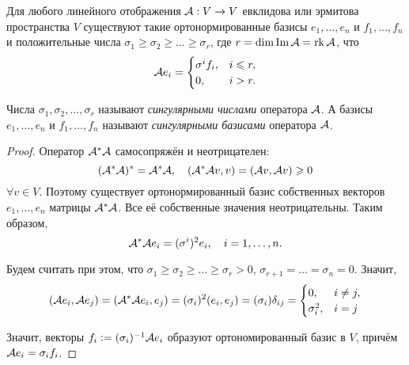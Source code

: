 \begin{theorem}
    Для любого линейного отображения $\mathcal{A}: V \to V$ евклидова или эрмитова пространства $V$ существуют такие ортонормированные базисы $e_1, \ldots, e_n$ и $f_1, \ldots, f_n$ и положительные числа $\sigma_1 \geqslant \sigma_2 \geqslant \ldots \geqslant \sigma_r$, где $r = \dim\operatorname{Im}\mathcal{A} = \operatorname{rk}\mathcal{A}$, что
    \[
        \mathcal{A} e_i =
        \begin{cases}
            \sigma^if_i,& i \leqslant r,\\
            0,& i > r.
        \end{cases}
    \]

    Числа $\sigma_1, \sigma_2, \ldots, \sigma_r$ называют \textit{сингулярными числами} оператора $\mathcal{A}$. А базисы $e_1, \ldots, e_n$ и $f_1, \ldots, f_n$ называют \textit{сингулярными базисами} оператора $\mathcal{A}$.
\end{theorem}

\begin{proof}
    Оператор $\mathcal{A}^\ast\mathcal{A}$ самосопряжён и неотрицателен:
    \[
        (\mathcal{A}^\ast\mathcal{A})^\ast = \mathcal{A}^\ast\mathcal{A},\quad(\mathcal{A}^\ast\mathcal{A} v, v) = (\mathcal{A} v, \mathcal{A} v) \geqslant 0
    \]
    $\forall v \in V$. Поэтому существует ортонормированный базис собственных векторов $e_1, \ldots, e_n$ матрицы $\mathcal{A}^\ast\mathcal{A}$. Все её собственные значения неотрицательны. Таким образом,
    \[
        \mathcal{A}^\ast\mathcal{A} e_i = (\sigma^i)^2e_i,\quad i = 1, \ldots, n.
    \]

    Будем считать при этом, что $\sigma_1 \geqslant \sigma_2 \geqslant \ldots \geqslant \sigma_r > 0$, $\sigma_{r + 1} = \ldots = \sigma_n = 0$. Значит,
    \[
        (\mathcal{A} e_i, \mathcal{A} e_j) = (\mathcal{A}^\ast\mathcal{A} e_i, e_j) = (\sigma_i)^2(e_i, e_j) = (\sigma_i)\delta_{ij} =
        \begin{cases}
            0,& i \ne j,\\
            \sigma_i^2,& i = j
        \end{cases}
    \]

    Значит, векторы $f_i \vcentcolon = (\sigma_i)^{-1}\mathcal{A} e_i$ образуют ортономированный базис в $V$, причём $\mathcal{A} e_i = \sigma_if_i$.
\end{proof}

